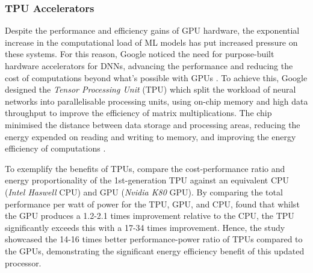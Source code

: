 \documentclass[a4paper, 12pt]{article}
\begin{document}
    \subsubsection{TPU Accelerators}

    Despite the performance and efficiency gains of GPU hardware, the exponential increase in the computational load of ML models has put increased pressure on these systems. For this reason, Google noticed the need for purpose-built hardware accelerators for DNNs, advancing the performance and reducing the cost of computations beyond what's possible with GPUs \citep{jouppi-2017}. To achieve this, Google designed the \emph{Tensor Processing Unit} (TPU) which split the workload of neural networks into parallelisable processing units, using on-chip memory and high data throughput to improve the efficiency of matrix multiplications. The chip minimised the distance between data storage and processing areas, reducing the energy expended on reading and writing to memory, and improving the energy efficiency of computations \citep{kumar-2020}.

    To exemplify the benefits of TPUs, \citet{jouppi-2017} compare the cost-performance ratio and energy proportionality of the 1st-generation TPU against an equivalent CPU (\emph{Intel Haswell} CPU) and GPU (\emph{Nvidia K80} GPU). By comparing the total performance per watt of power for the TPU, GPU, and CPU, \citet{jouppi-2017} found that whilst the GPU produces a 1.2-2.1 times improvement relative to the CPU, the TPU significantly exceeds this with a 17-34 times improvement. Hence, the study showcased the 14-16 times better performance-power ratio of TPUs compared to the GPUs, demonstrating the significant energy efficiency benefit of this updated processor.
\end{document}
